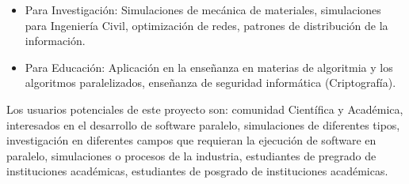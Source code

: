 \begin{itemize}
\begin{itemize}


		\item Para Investigación: Simulaciones de mecánica de materiales, simulaciones para Ingeniería Civil, optimización de redes, patrones de distribución de la información.


		\item Para Educación: Aplicación en la enseñanza en materias de algoritmia y los algoritmos paralelizados, 		enseñanza de seguridad informática (Criptografía).



	\end{itemize}

		Los usuarios potenciales de este proyecto son: comunidad Científica y Académica, interesados en el desarrollo de software paralelo, simulaciones de diferentes tipos, investigación en diferentes campos que requieran la ejecución de software en paralelo,  simulaciones o procesos de la industria, estudiantes de pregrado de instituciones académicas, estudiantes de posgrado de instituciones académicas. 


\end{itemize}


